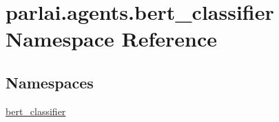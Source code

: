 \hypertarget{namespaceparlai_1_1agents_1_1bert__classifier}{}\section{parlai.\+agents.\+bert\+\_\+classifier Namespace Reference}
\label{namespaceparlai_1_1agents_1_1bert__classifier}
\subsection*{Namespaces}
\begin{DoxyCompactItemize}
\item 
 \hyperlink{namespaceparlai_1_1agents_1_1bert__classifier_1_1bert__classifier}{bert\+\_\+classifier}
\end{DoxyCompactItemize}

